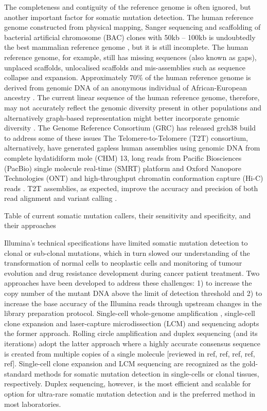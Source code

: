 The completeness and contiguity of the reference genome is often ignored, but another important factor for somatic mutation detection. The human reference genome constructed from physical mapping, Sanger sequencing and scaffolding of bacterial artificial chromosome (BAC) clones with 50kb – 100kb is undoubtedly the best mammalian reference genome \cite{Lander2001-du}, but it is still incomplete. The human reference genome, for example, still has missing sequences (also known as gaps), unplaced scaffolds, unlocalised scaffolds and mis-assemblies such as sequence collapse and expansion. Approximately 70\% of the human reference genome is derived from genomic DNA of an anonymous individual of African-European ancestry \cite{Osoegawa2001-np}. The current linear sequence of the human reference genome, therefore, may not accurately reflect the genomic diversity present in other populations and alternatively graph-based representation might better incorporate genomic diversity \cite{Garrison2018-ae}. The Genome Reference Consortium (GRC) has released grch38 build to address some of these issues \cite{Schneider2017-yo} The Telomere-to-Telomere (T2T) consortium, alternatively, have generated gapless human assemblies using genomic DNA from complete hydatidiform mole (CHM) 13, long reads from Pacific Biosciences (PacBio) single molecule real-time (SMRT) platform and Oxford Nanopore Technologies (ONT) and high-throughput chromatin conformation capture (Hi-C) reads \cite{Nurk2022-dv}. T2T assemblies, as expected, improve the accuracy and precision of both read alignment and variant calling \cite{Aganezov2022-dv}. 

Table of current somatic mutation callers, their sensitivity and specificity, and their approaches

Illumina’s technical specifications have limited somatic mutation detection to clonal or sub-clonal mutations, which in turn slowed our understanding of the transformation of normal cells to neoplastic cells and monitoring of tumour evolution and drug resistance development during cancer patient treatment. Two approaches have been developed to address these challenges: 1) to increase the copy number of the mutant DNA above the limit of detection threshold and 2) to increase the base accuracy of the Illumina reads through upstream changes in the library preparation protocol. Single-cell whole-genome amplification \cite{Lodato2018-hh}, single-cell clone expansion \cite{Lee-Six2018-qe} and laser-capture microdissection (LCM) \cite{Ellis2021-it} and sequencing adopts the former approach. Rolling circle amplification and duplex sequencing (and its iterations) adopt the latter approach where a highly accurate consensus sequence is created from multiple copies of a single molecule [reviewed in ref, ref, ref, ref, ref]. Single-cell clone expansion and LCM sequencing are recognized as the gold-standard methods for somatic mutation detection in single-cells or clonal tissues, respectively. Duplex sequencing, however, is the most efficient and scalable for option for ultra-rare somatic mutation detection and is the preferred method in most laboratories. 

